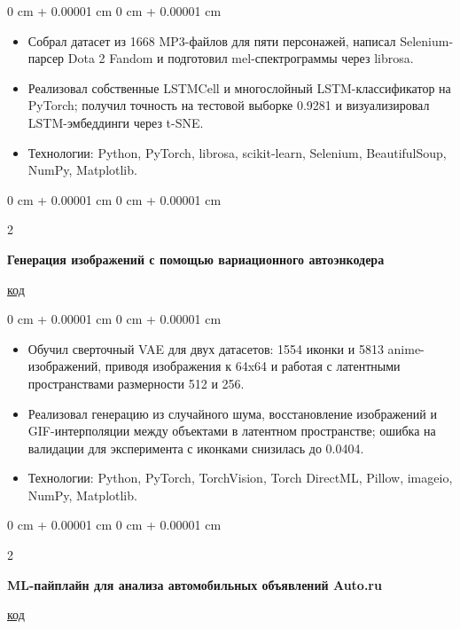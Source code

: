 \documentclass[10pt, letterpaper]{article}
\newenvironment{highlights}{
    \begin{itemize}[
        topsep=0.10 cm,
        parsep=0.10 cm,
        partopsep=0pt,
        itemsep=0pt,
        leftmargin=0 cm + 10pt
    ]
}{
    \end{itemize}
}
\newenvironment{onecolentry}{
    \begin{adjustwidth}{
        0 cm + 0.00001 cm
    }{
        0 cm + 0.00001 cm
    }
}{
    \end{adjustwidth}
}
\newenvironment{twocolentry}[2][]{
    \onecolentry
    \def\secondColumn{#2}
    \setcolumnwidth{\fill, 4.5 cm}
    \begin{paracol}{2}
}{
    \switchcolumn \raggedleft \secondColumn
    \end{paracol}
    \endonecolentry
}
\begin{document}
        \vspace{0.10 cm}
        \begin{onecolentry}
            \begin{highlights}
                \item Собрал датасет из 1668 MP3-файлов для пяти персонажей, написал Selenium-парсер Dota 2 Fandom и подготовил mel-спектрограммы через librosa.
                \item Реализовал собственные LSTMCell и многослойный LSTM-классификатор на PyTorch; получил точность на тестовой выборке 0.9281 и визуализировал LSTM-эмбеддинги через t-SNE.
                \item Технологии: Python, PyTorch, librosa, scikit-learn, Selenium, BeautifulSoup, NumPy, Matplotlib.
            \end{highlights}
        \end{onecolentry}

        \vspace{0.2 cm}

        \begin{twocolentry}{
            \href{https://github.com/Komperlan/Labs/tree/main/ml/5-generative-Komperlan-main}{код}
        }
            \textbf{Генерация изображений с помощью вариационного автоэнкодера}
        \end{twocolentry}

        \vspace{0.10 cm}
        \begin{onecolentry}
            \begin{highlights}
                \item Обучил сверточный VAE для двух датасетов: 1554 иконки и 5813 anime-изображений, приводя изображения к 64x64 и работая с латентными пространствами размерности 512 и 256.
                \item Реализовал генерацию из случайного шума, восстановление изображений и GIF-интерполяции между объектами в латентном пространстве; ошибка на валидации для эксперимента с иконками снизилась до 0.0404.
                \item Технологии: Python, PyTorch, TorchVision, Torch DirectML, Pillow, imageio, NumPy, Matplotlib.
            \end{highlights}
        \end{onecolentry}

        \vspace{0.2 cm}

        \begin{twocolentry}{
            \href{https://github.com/Komperlan/Labs/tree/main/ml}{код}
        }
            \textbf{ML-пайплайн для анализа автомобильных объявлений Auto.ru}
        \end{twocolentry}
\end{document}
